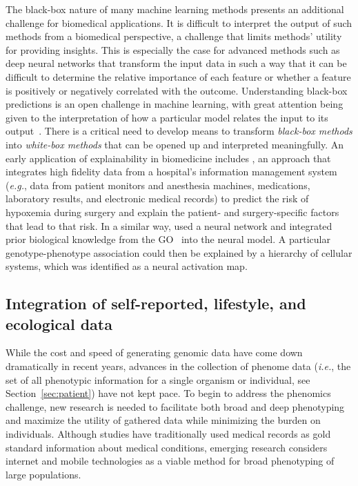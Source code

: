 \documentclass[5p]{elsarticle}
\newcommand{\eg}{\emph{e.g.}\xspace}
\newcommand{\ie}{\emph{i.e.}\xspace}
\newcommand{\rev}[1]{{\color{black}#1}}
\begin{document}
The black-box nature of many  machine learning methods presents an additional challenge for biomedical applications.
It \rev{is  difficult to interpret the output of such methods} from a biomedical perspective, a challenge that limits \rev{methods' utility} for providing insights\rev{.}
This is especially the case for advanced \rev{methods} such as deep neural networks that transform the input data in such a way that it can be difficult to determine the relative importance of each feature or whether a feature is positively or negatively correlated with the outcome.
Understanding black-box predictions is an open challenge in machine learning, with great attention being given to the interpretation of how a particular model relates the input to its output~\cite{Ribeiro2016should,Lundberg2017unified,Arpit2017closer,Koh2017understanding}.
There is a critical need to develop means to \rev{transform {\em black-box methods} into {\em white-box methods}} that can be opened up and interpreted meaningfully\rev{.}
An early application of explainability in biomedicine includes \cite{Lundberg2017explainable}, an approach that integrates high fidelity data from a hospital's information management system (\eg, data from patient monitors and anesthesia machines, medications, laboratory results, and electronic medical records) to predict the risk of hypoxemia during surgery and explain the patient- and surgery-specific factors that lead to that risk.
In a similar way, \cite{Ma2018using} used a neural network and integrated \rev{prior biological knowledge from \rev{the GO}~\cite{Ashburner2000gene} into the neural model}.
A particular genotype-phenotype association could then be explained by a hierarchy of \rev{cellular systems, which was identified as a neural activation map.}

\subsection{Integration of self-reported, lifestyle, and ecological data}


While the cost and speed of generating genomic data have come down dramatically in recent years, advances in the collection of phenome data (\ie, the set of all phenotypic information for a single organism or individual, see Section~\ref{sec:patient}) have not kept pace.
To begin to address the phenomics challenge, new research \rev{is needed to facilitate both broad} and deep phenotyping and maximize the utility of gathered data while minimizing the burden on individuals.
Although studies have traditionally used medical records \rev{as gold} standard information about medical conditions, emerging research \rev{considers} internet and mobile technologies as a viable method for broad phenotyping \rev{of} large populations.
\end{document}

